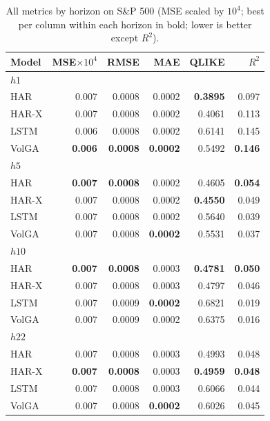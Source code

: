\begin{table}[t]
\centering
\caption{All metrics by horizon on S\&P 500 (MSE scaled by $10^{4}$; best per column within each horizon in bold; lower is better except $R^2$).}
\label{tab:full_sp500_clean}
\begin{tabular}{lrrrrr}
\toprule
Model & MSE$\times10^{4}$ & RMSE & MAE & QLIKE & $R^2$ \\
\midrule
\multicolumn{6}{l}{\textit{$h1$}} \\
HAR & 0.007 & 0.0008 & 0.0002 & \textbf{0.3895} & 0.097 \\
HAR-X & 0.007 & 0.0008 & 0.0002 & 0.4061 & 0.113 \\
LSTM & 0.006 & 0.0008 & 0.0002 & 0.6141 & 0.145 \\
VolGA & \textbf{0.006} & \textbf{0.0008} & \textbf{0.0002} & 0.5492 & \textbf{0.146} \\
\midrule
\multicolumn{6}{l}{\textit{$h5$}} \\
HAR & \textbf{0.007} & \textbf{0.0008} & 0.0002 & 0.4605 & \textbf{0.054} \\
HAR-X & 0.007 & 0.0008 & 0.0002 & \textbf{0.4550} & 0.049 \\
LSTM & 0.007 & 0.0008 & 0.0002 & 0.5640 & 0.039 \\
VolGA & 0.007 & 0.0008 & \textbf{0.0002} & 0.5531 & 0.037 \\
\midrule
\multicolumn{6}{l}{\textit{$h10$}} \\
HAR & \textbf{0.007} & \textbf{0.0008} & 0.0003 & \textbf{0.4781} & \textbf{0.050} \\
HAR-X & 0.007 & 0.0008 & 0.0003 & 0.4797 & 0.046 \\
LSTM & 0.007 & 0.0009 & \textbf{0.0002} & 0.6821 & 0.019 \\
VolGA & 0.007 & 0.0009 & 0.0002 & 0.6375 & 0.016 \\
\midrule
\multicolumn{6}{l}{\textit{$h22$}} \\
HAR & 0.007 & 0.0008 & 0.0003 & 0.4993 & 0.048 \\
HAR-X & \textbf{0.007} & \textbf{0.0008} & 0.0003 & \textbf{0.4959} & \textbf{0.048} \\
LSTM & 0.007 & 0.0008 & 0.0003 & 0.6066 & 0.044 \\
VolGA & 0.007 & 0.0008 & \textbf{0.0002} & 0.6026 & 0.045 \\
\bottomrule
\end{tabular}
\end{table}
